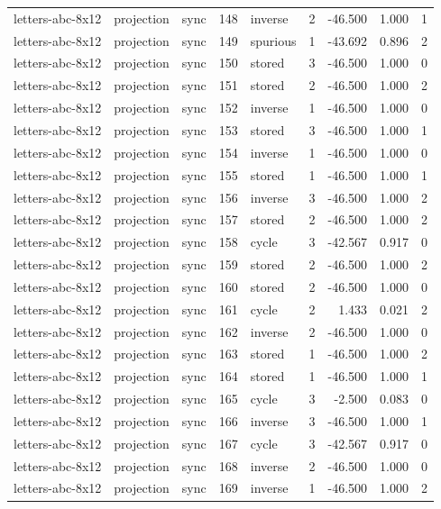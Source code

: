 \begin{tabular}{lllrlrrrr}
letters-abc-8x12 & projection & sync & 148 & inverse & 2 & -46.500 & 1.000 & 1 \\
letters-abc-8x12 & projection & sync & 149 & spurious & 1 & -43.692 & 0.896 & 2 \\
letters-abc-8x12 & projection & sync & 150 & stored & 3 & -46.500 & 1.000 & 0 \\
letters-abc-8x12 & projection & sync & 151 & stored & 2 & -46.500 & 1.000 & 2 \\
letters-abc-8x12 & projection & sync & 152 & inverse & 1 & -46.500 & 1.000 & 0 \\
letters-abc-8x12 & projection & sync & 153 & stored & 3 & -46.500 & 1.000 & 1 \\
letters-abc-8x12 & projection & sync & 154 & inverse & 1 & -46.500 & 1.000 & 0 \\
letters-abc-8x12 & projection & sync & 155 & stored & 1 & -46.500 & 1.000 & 1 \\
letters-abc-8x12 & projection & sync & 156 & inverse & 3 & -46.500 & 1.000 & 2 \\
letters-abc-8x12 & projection & sync & 157 & stored & 2 & -46.500 & 1.000 & 2 \\
letters-abc-8x12 & projection & sync & 158 & cycle & 3 & -42.567 & 0.917 & 0 \\
letters-abc-8x12 & projection & sync & 159 & stored & 2 & -46.500 & 1.000 & 2 \\
letters-abc-8x12 & projection & sync & 160 & stored & 2 & -46.500 & 1.000 & 0 \\
letters-abc-8x12 & projection & sync & 161 & cycle & 2 & 1.433 & 0.021 & 2 \\
letters-abc-8x12 & projection & sync & 162 & inverse & 2 & -46.500 & 1.000 & 0 \\
letters-abc-8x12 & projection & sync & 163 & stored & 1 & -46.500 & 1.000 & 2 \\
letters-abc-8x12 & projection & sync & 164 & stored & 1 & -46.500 & 1.000 & 1 \\
letters-abc-8x12 & projection & sync & 165 & cycle & 3 & -2.500 & 0.083 & 0 \\
letters-abc-8x12 & projection & sync & 166 & inverse & 3 & -46.500 & 1.000 & 1 \\
letters-abc-8x12 & projection & sync & 167 & cycle & 3 & -42.567 & 0.917 & 0 \\
letters-abc-8x12 & projection & sync & 168 & inverse & 2 & -46.500 & 1.000 & 0 \\
letters-abc-8x12 & projection & sync & 169 & inverse & 1 & -46.500 & 1.000 & 2 \\

\end{tabular}
